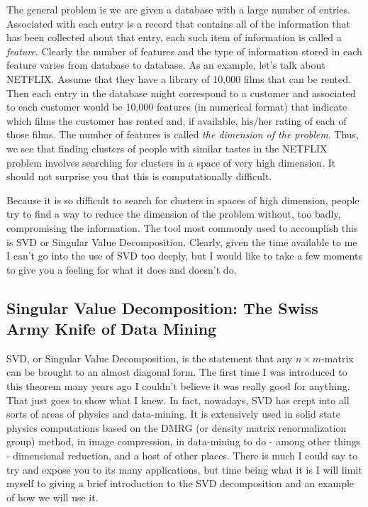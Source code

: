 \documentclass[fleqn,twoside]{article}
\begin{document}
The general problem is we are given a database with a large number of
entries.  Associated with each entry is a record that contains all
of the information that has been collected about that entry, each
such item of information is called a {\it feature\/}.  Clearly the
number of features and the type of information stored in each
feature varies from database to database.  As an example, let's talk
about NETFLIX. Assume that they have a library of 10,000 films that
can be rented.  Then each entry in the database might correspond to
a customer and associated to each customer would be 10,000 features
(in numerical format) that indicate which films the customer has
rented and, if available, his/her rating of each of those films.
The number of features is called {\it the dimension of the problem\/}.
Thus, we see that finding clusters of people with similar tastes in
the NETFLIX problem involves searching for clusters in a space of
very high dimension.  It should not surprise you that this is
computationally difficult.

Because it is so difficult to search for clusters in spaces of high
dimension, people try to find a way to reduce the dimension of the
problem without, too badly, compromising the information.  The tool
most commonly used to accomplish this is SVD or Singular Value
Decomposition.  Clearly, given the time available to me I can't
go into the use of SVD too deeply, but I would like to take a
few moments to give you a feeling for what it does and doesn't
do.

\subsection{Singular Value Decomposition: The Swiss Army Knife of Data Mining}

SVD, or Singular Value Decomposition, is the statement that any $n
\times m$-matrix can be brought to an almost diagonal form.  The
first time I was introduced to this theorem many years ago I
couldn't believe it was really good for anything.  That just goes to
show what I knew. In fact, nowadays, SVD has crept into all sorts
of areas of physics and data-mining.  It is extensively used in
solid state physics computations based on the DMRG (or density
matrix renormalization group) method, in image compression, in
data-mining to do - among other things - dimensional reduction,
and a host of other places.  There is much I could say to try and
expose you to its many applications, but time being what it is I
will limit myself to giving a brief introduction to the SVD
decomposition and an example of how we will use it.
\end{document}
